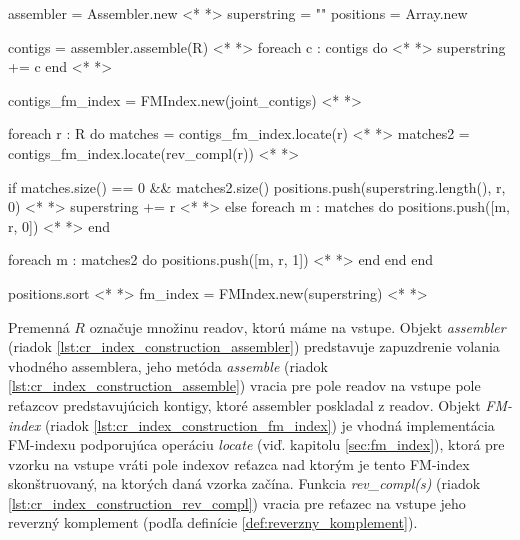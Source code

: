 \bigskip
\begin{pseudocode}[label=lst:cr_index_construction,caption={Algoritmus konštrukcie CR-indexu nad readmi bez chýb.}]
assembler = Assembler.new <* \label{lst:cr_index_construction_assembler} *>
superstring = ""
positions = Array.new

contigs = assembler.assemble(R) <* \label{lst:cr_index_construction_assemble} *>
foreach c : contigs do <* \label{lst:cr_index_construction_contigs_start} *>
  superstring += c 
end <* \label{lst:cr_index_construction_contigs_end} *>

contigs_fm_index = FMIndex.new(joint_contigs) <* \label{lst:cr_index_construction_fm_index} *>

foreach r : R  do
  matches = contigs_fm_index.locate(r) <* \label{lst:cr_index_construction_locate} *>
  matches2 = contigs_fm_index.locate(rev_compl(r)) <* \label{lst:cr_index_construction_rev_compl} *>

  if matches.size() == 0 && matches2.size() 
    positions.push(superstring.length(), r, 0) <* \label{lst:cr_index_construction_push} *> 
    superstring += r <* \label{lst:cr_index_construction_superstring_r} *>  
  else
    foreach m : matches do
      positions.push([m, r, 0]) <* \label{lst:cr_index_construction_push2} *>  
    end
    
    foreach m : matches2 do
      positions.push([m, r, 1]) <* \label{lst:cr_index_construction_push3} *>  
    end
  end
end

positions.sort <* \label{lst:cr_index_construction_sort} *>  
fm_index = FMIndex.new(superstring) <* \label{lst:cr_index_construction_fm_index2} *>
\end{pseudocode}
\bigskip

Premenná $R$ označuje množinu readov, ktorú máme na vstupe. Objekt \emph{assembler} (riadok \ref{lst:cr_index_construction_assembler}) predstavuje zapuzdrenie volania vhodného assemblera, jeho metóda \emph{assemble} (riadok \ref{lst:cr_index_construction_assemble}) vracia pre pole readov na vstupe pole reťazcov predstavujúcich kontigy, ktoré assembler poskladal z readov. Objekt \emph{FM-index} (riadok \ref{lst:cr_index_construction_fm_index}) je vhodná implementácia FM-indexu podporujúca operáciu \emph{locate} (viď. kapitolu \ref{sec:fm_index}), ktorá pre vzorku na vstupe vráti pole indexov reťazca nad ktorým je tento FM-index skonštruovaný, na ktorých daná vzorka začína. Funkcia \emph{rev\_compl(s)} (riadok \ref{lst:cr_index_construction_rev_compl}) vracia pre reťazec na vstupe jeho reverzný komplement (podľa definície \ref{def:reverzny_komplement}).

